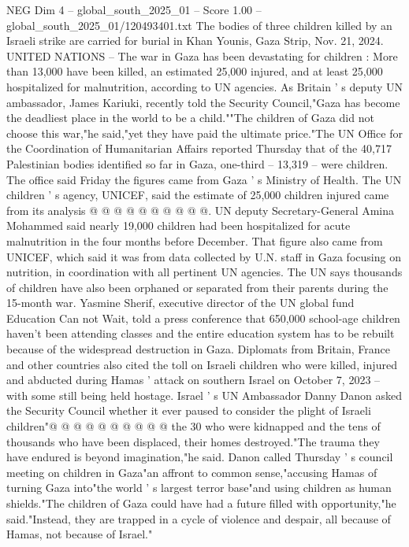 \begin{textsample}{NEG Dim 4 – global\_south\_2025\_01 – Score 1.00 – global\_south\_2025\_01/120493401.txt}  \label{ex:f4_neg_442}
The bodies of three children killed by an Israeli strike are carried for burial in Khan Younis, Gaza Strip, Nov. 21, 2024.
UNITED NATIONS -- The war in Gaza has been devastating for children : More than 13,000 have been killed, an estimated 25,000 injured, and at least 25,000 hospitalized for malnutrition, according to UN agencies.
As Britain ' s deputy UN ambassador, James Kariuki, recently told the Security Council,"Gaza has become the deadliest place in the world to be a child.""The children of Gaza did not choose this war,"he said,"yet they have paid the ultimate price."The UN Office for the Coordination of Humanitarian Affairs reported Thursday that of the 40,717 Palestinian bodies identified so far in Gaza, one-third -- 13,319 -- were children.
The office said Friday the figures came from Gaza ' s Ministry of Health.
The UN children ' s agency, UNICEF, said the estimate of 25,000 children injured came from its analysis @ @ @ @ @ @ @ @ @ @.
UN deputy Secretary-General Amina Mohammed said nearly 19,000 children had been hospitalized for acute malnutrition in the four months before December.
That figure also came from UNICEF, which said it was from data collected by U.N. staff in Gaza focusing on nutrition, in coordination with all pertinent UN agencies.
The UN says thousands of children have also been orphaned or separated from their parents during the 15-month war.
Yasmine Sherif, executive director of the UN global fund Education Can not Wait, told a press conference that 650,000 school-age children haven't been attending classes and the entire education system has to be rebuilt because of the widespread destruction in Gaza.
Diplomats from Britain, France and other countries also cited the toll on Israeli children who were killed, injured and abducted during Hamas ' attack on southern Israel on October 7, 2023 -- with some still being held hostage.
Israel ' s UN Ambassador Danny Danon asked the Security Council whether it ever paused to consider the plight of Israeli children"@ @ @ @ @ @ @ @ @ @ the 30 who were kidnapped and the tens of thousands who have been displaced, their homes destroyed."The trauma they have endured is beyond imagination,"he said.
Danon called Thursday ' s council meeting on children in Gaza"an affront to common sense,"accusing Hamas of turning Gaza into"the world ' s largest terror base"and using children as human shields."The children of Gaza could have had a future filled with opportunity,"he said."Instead, they are trapped in a cycle of violence and despair, all because of Hamas, not because of Israel."

\end{textsample}
